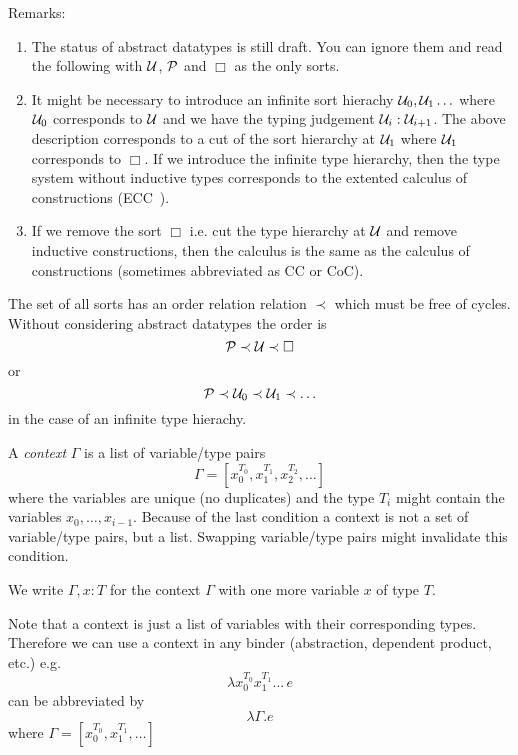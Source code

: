 Remarks:
\begin{enumerate}
\item The status of abstract datatypes is still draft. You can ignore them and
  read the following with ${\cal{U}}$, ${\cal{P}}$ and $\Box$ as the only sorts.

\item It might be necessary to introduce an infinite sort hierachy
  ${\cal{U}}_0, {\cal{U}}_1 \ldots$ where ${\cal{U}}_0$ corresponds to ${\cal{U}}$ and we have the
  typing judgement ${\cal{U}}_i : {\cal{U}}_{i+1}$. The above description corresponds to
  a cut of the sort hierarchy at ${\cal{U}}_1$ where ${\cal{U}}_1$ corresponds to
  $\Box$. If we introduce the infinite type hierarchy, then the type system
  without inductive types corresponds to the extented calculus of
  constructions (ECC~\cite{luo1990}).

\item If we remove the sort $\Box$ i.e. cut the type hierarchy at ${\cal{U}}$ and
  remove inductive constructions, then the calculus is the same as the
  calculus of constructions (sometimes abbreviated as CC or CoC).
\end{enumerate}



The set of all sorts has an order relation relation $\prec$ which must be free
of cycles. Without considering abstract datatypes the order is
$$
{\cal{P}} \prec {\cal{U}} \prec \Box
$$
or
$$
{\cal{P}} \prec {\cal{U}}_0 \prec {\cal{U}}_1 \prec \ldots
$$
in the case of an infinite type hierachy.




\begin{definition}
  A \emph{context} $\Gamma$ is a list of variable/type pairs
  $$
  \Gamma = [x_0^{T_0}, x_1^{T_1}, x_2^{T_2}, \ldots]
  $$
  where the variables are unique (no duplicates) and the type $T_i$ might
  contain the variables $x_0, \ldots, x_{i-1}$. Because of the last condition
  a context is not a set of variable/type pairs, but a list. Swapping
  variable/type pairs might invalidate this condition.

  We write $\Gamma, x:T$ for the context $\Gamma$ with one more variable $x$
  of type $T$.

  Note that a context is just a list of variables with their corresponding
  types. Therefore we can use a context in any binder (abstraction, dependent
  product, etc.) e.g.
  $$
  \lambda x_0^{T_0} x_1^{T_1} \ldots \, e
  $$
  can be abbreviated by
  $$
  \lambda \Gamma . e
  $$
  where $\Gamma = [x_0^{T_0}, x_1^{T_1}, \ldots]$
\end{definition}








